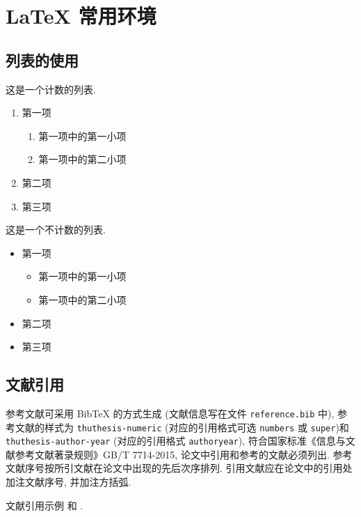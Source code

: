

\chapter{LaTeX 常用环境}

\section{列表的使用}

这是一个计数的列表.
\begin{enumerate}%
  \item 第一项
    \begin{enumerate}
      \item 第一项中的第一小项
      \item 第一项中的第二小项
    \end{enumerate}
  \item 第二项
  \item 第三项
\end{enumerate}

这是一个不计数的列表.
\begin{itemize}%
  \item 第一项
  \begin{itemize}
    \item 第一项中的第一小项
    \item 第一项中的第二小项
  \end{itemize}
  \item 第二项
  \item 第三项
\end{itemize}


\section{文献引用}

参考文献可采用 BibTeX 的方式生成 (文献信息写在文件 \verb|reference.bib| 中), 参考文献的样式为 \verb|thuthesis-numeric| (对应的引用格式可选 \verb|numbers| 或  \verb|super|)和 \verb|thuthesis-author-year| (对应的引用格式 \verb|authoryear|), 符合国家标准《信息与文献参考文献著录规则》GB/T 7714-2015, 论文中引用和参考的文献必须列出. 参考文献序号按所引文献在论文中出现的先后次序排列. 引用文献应在论文中的引用处加注文献序号, 并加注方括弧.

文献引用示例 \cite[定理~1.1]{LiLiu1997} 和 \cite{Adams2003,Shen1994}.


